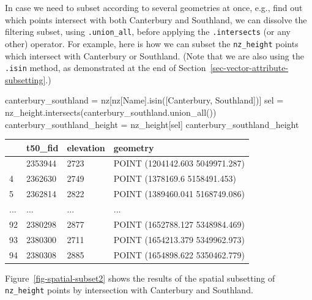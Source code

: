 \documentclass[
  letterpaper,
]{krantz}
\newenvironment{Shaded}{\begin{snugshade}}{\end{snugshade}}
\newcommand{\NormalTok}[1]{\textcolor[rgb]{0.00,0.23,0.31}{#1}}
\newcommand{\OperatorTok}[1]{\textcolor[rgb]{0.37,0.37,0.37}{#1}}
\newcommand{\StringTok}[1]{\textcolor[rgb]{0.13,0.47,0.30}{#1}}
\begin{document}
In case we need to subset according to several geometries at once, e.g.,
find out which points intersect with both Canterbury and Southland, we
can dissolve the filtering subset, using \texttt{.union\_all}, before
applying the \texttt{.intersects} (or any other) operator. For example,
here is how we can subset the \texttt{nz\_height} points which intersect
with Canterbury or Southland. (Note that we are also using the
\texttt{.isin} method, as demonstrated at the end of
Section~\ref{sec-vector-attribute-subsetting}.)

\begin{Shaded}
\begin{Highlighting}[]
\NormalTok{canterbury\_southland }\OperatorTok{=}\NormalTok{ nz[nz[}\StringTok{\textquotesingle{}Name\textquotesingle{}}\NormalTok{].isin([}\StringTok{\textquotesingle{}Canterbury\textquotesingle{}}\NormalTok{, }\StringTok{\textquotesingle{}Southland\textquotesingle{}}\NormalTok{])]}
\NormalTok{sel }\OperatorTok{=}\NormalTok{ nz\_height.intersects(canterbury\_southland.union\_all())}
\NormalTok{canterbury\_southland\_height }\OperatorTok{=}\NormalTok{ nz\_height[sel]}
\NormalTok{canterbury\_southland\_height}
\end{Highlighting}
\end{Shaded}

\begin{longtable}[]{@{}llll@{}}
\toprule\noalign{}
& t50\_fid & elevation & geometry \\
\midrule\noalign{}
\endhead
\bottomrule\noalign{}
\endlastfoot
0 & 2353944 & 2723 & POINT (1204142.603 5049971.287) \\
4 & 2362630 & 2749 & POINT (1378169.6 5158491.453) \\
5 & 2362814 & 2822 & POINT (1389460.041 5168749.086) \\
... & ... & ... & ... \\
92 & 2380298 & 2877 & POINT (1652788.127 5348984.469) \\
93 & 2380300 & 2711 & POINT (1654213.379 5349962.973) \\
94 & 2380308 & 2885 & POINT (1654898.622 5350462.779) \\
\end{longtable}

Figure~\ref{fig-spatial-subset2} shows the results of the spatial
subsetting of \texttt{nz\_height} points by intersection with Canterbury
and Southland.
\end{document}
